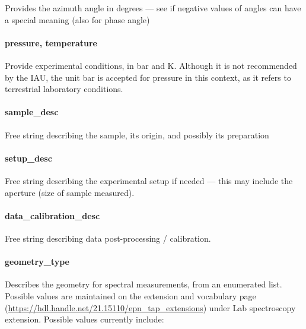 \documentclass[11pt,a4paper]{ivoa}
\begin{document}
Provides the azimuth angle in degrees --- see if negative values of angles
can have a special meaning (also for phase angle)

\paragraph{pressure, temperature}

Provide experimental conditions, in bar and K. Although it is not recommended
by the IAU, the unit bar is accepted for pressure in this context, as it refers
to terrestrial laboratory conditions.

\paragraph{sample\_desc}

Free string describing the sample, its origin,
and possibly its preparation

\paragraph{setup\_desc}

Free string describing the experimental setup if
needed --- this may include the aperture (size of sample measured).

\paragraph{data\_calibration\_desc}

Free string describing data post-processing / calibration.

\paragraph{geometry\_type}

Describes the geometry for spectral measurements, from an enumerated list.
Possible values are maintained on the extension and vocabulary page
(\url{https://hdl.handle.net/21.15110/epn_tap_extensions})  under Lab spectroscopy extension.
Possible values currently include:
\end{document}

